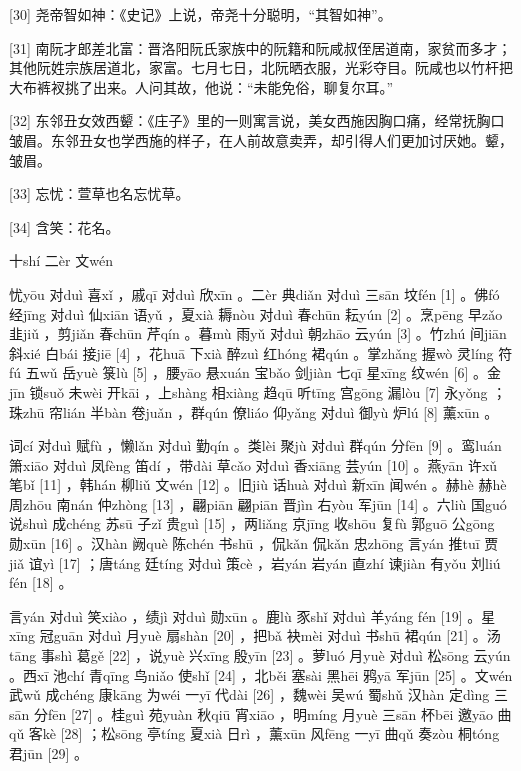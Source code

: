 \documentclass[12pt,UTF8]{ctexbook}
\begin{document}
[30] 尧帝智如神：《史记》上说，帝尧十分聪明，“其智如神”。

[31] 南阮才郎差北富：晋洛阳阮氏家族中的阮籍和阮咸叔侄居道南，家贫而多才；其他阮姓宗族居道北，家富。七月七日，北阮晒衣服，光彩夺目。阮咸也以竹杆把大布裤衩挑了出来。人问其故，他说：“未能免俗，聊复尔耳。”

[32] 东邻丑女效西颦：《庄子》里的一则寓言说，美女西施因胸口痛，经常抚胸口皱眉。东邻丑女也学西施的样子，在人前故意卖弄，却引得人们更加讨厌她。颦，皱眉。

[33] 忘忧：萱草也名忘忧草。

[34] 含笑：花名。





十shí 二èr 文wén


忧yōu 对duì 喜xǐ ，戚qī 对duì 欣xīn 。二èr 典diǎn 对duì 三sān 坟fén [1] 。佛fó 经jīng 对duì 仙xiān 语yǔ ，夏xià 耨nòu 对duì 春chūn 耘yún [2] 。烹pēng 早zǎo 韭jiǔ ，剪jiǎn 春chūn 芹qín 。暮mù 雨yǔ 对duì 朝zhāo 云yún [3] 。竹zhú 间jiān 斜xié 白bái 接jiē [4] ，花huā 下xià 醉zuì 红hóng 裙qún 。掌zhǎng 握wò 灵líng 符fú 五wǔ 岳yuè 箓lù [5] ，腰yāo 悬xuán 宝bǎo 剑jiàn 七qī 星xīng 纹wén [6] 。金jīn 锁suǒ 未wèi 开kāi ，上shàng 相xiàng 趋qū 听tīng 宫gōng 漏lòu [7] 永yǒng ；珠zhū 帘lián 半bàn 卷juǎn ，群qún 僚liáo 仰yǎng 对duì 御yù 炉lú [8] 薰xūn 。

词cí 对duì 赋fù ，懒lǎn 对duì 勤qín 。类lèi 聚jù 对duì 群qún 分fēn [9] 。鸾luán 箫xiāo 对duì 凤fèng 笛dí ，带dài 草cǎo 对duì 香xiāng 芸yún [10] 。燕yān 许xǔ 笔bǐ [11] ，韩hán 柳liǔ 文wén [12] 。旧jiù 话huà 对duì 新xīn 闻wén 。赫hè 赫hè 周zhōu 南nán 仲zhòng [13] ，翩piān 翩piān 晋jìn 右yòu 军jūn [14] 。六liù 国guó 说shuì 成chéng 苏sū 子zǐ 贵guì [15] ，两liǎng 京jīng 收shōu 复fù 郭guō 公gōng 勋xūn [16] 。汉hàn 阙què 陈chén 书shū ，侃kǎn 侃kǎn 忠zhōng 言yán 推tuī 贾jiǎ 谊yì [17] ；唐táng 廷tíng 对duì 策cè ，岩yán 岩yán 直zhí 谏jiàn 有yǒu 刘liú fén [18] 。

言yán 对duì 笑xiào ，绩jì 对duì 勋xūn 。鹿lù 豕shǐ 对duì 羊yáng fén [19] 。星xīng 冠guān 对duì 月yuè 扇shàn [20] ，把bǎ 袂mèi 对duì 书shū 裙qún [21] 。汤tāng 事shì 葛gě [22] ，说yuè 兴xīng 殷yīn [23] 。萝luó 月yuè 对duì 松sōng 云yún 。西xī 池chí 青qīng 鸟niǎo 使shǐ [24] ，北běi 塞sài 黑hēi 鸦yā 军jūn [25] 。文wén 武wǔ 成chéng 康kāng 为wéi 一yī 代dài [26] ，魏wèi 吴wú 蜀shǔ 汉hàn 定dìng 三sān 分fēn [27] 。桂guì 苑yuàn 秋qiū 宵xiāo ，明míng 月yuè 三sān 杯bēi 邀yāo 曲qǔ 客kè [28] ；松sōng 亭tíng 夏xià 日rì ，薰xūn 风fēng 一yī 曲qǔ 奏zòu 桐tóng 君jūn [29] 。
\end{document}
